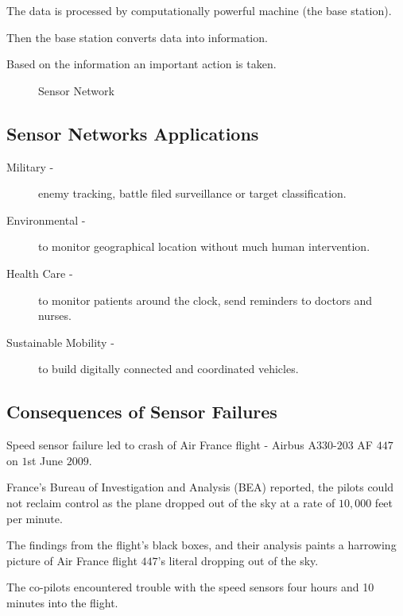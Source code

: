 \documentclass[%
  slidesonly,%
  semlayer%
  ]{seminar}                                  %
\begin{document}
\begin{slide}
    The data is processed by computationally powerful machine (the base station).

    Then the base station converts data into information.

    Based on the information an important action is taken.

    \begin{figure}[h!]
      \centering
      \caption{Sensor Network}
      \label{fig:sensor-network}
    \end{figure}

    \clearpage

  \subsection*{Sensor Networks Applications}
    \begin{description}
    \item[Military -] enemy tracking, battle filed surveillance or target classification.

    \item[Environmental -] to monitor geographical location without much human intervention.
    
    \item[Health Care -]  to monitor patients around the clock, send reminders to doctors and nurses.
  
    \item[Sustainable Mobility -] to build digitally connected and coordinated vehicles.
    \end{description}

    \clearpage

  \subsection*{Consequences of Sensor Failures}
      Speed sensor failure led to crash of Air France flight - Airbus A$330$-$203$ AF $447$ on $1$st June $2009$.
      
      France's Bureau of Investigation and Analysis (BEA) reported, the pilots could not reclaim control as the plane dropped out of the sky at a rate of $10,000$ feet per minute.

      The findings from the flight's black boxes, and their analysis paints a harrowing picture of Air France flight $447$'s literal dropping out of the sky.

      The co-pilots encountered trouble with the speed sensors four hours and 10 minutes into the flight.


\end{slide}
\end{document}
